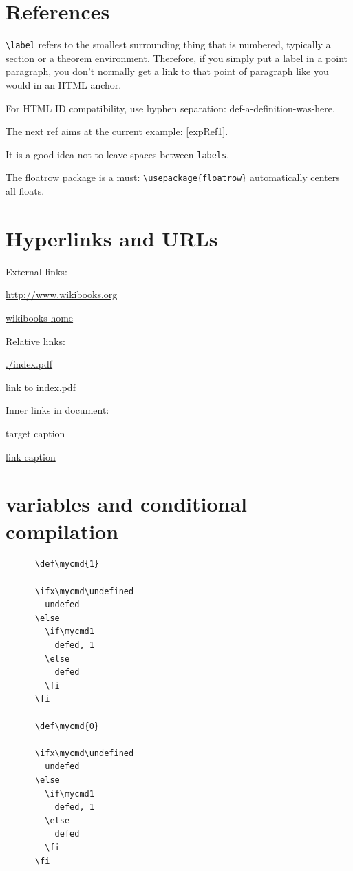 \documentclass[12pt]{article}
\begin{document}
\section{References}\label{references}

  \lstinline|\label| refers to the smallest surrounding thing that is numbered,
  typically a section or a theorem environment.
  Therefore, if you simply put a label in a point paragraph,
  you don't normally get a link to that point of paragraph like you would in an HTML anchor.

  For HTML ID compatibility, use hyphen separation: def-a-definition-was-here.

  \begin{example} \label{expRef1}
    The next ref aims at the current example: \ref{expRef1}.
  \end{example}

  It is a good idea not to leave spaces between \lstinline|labels|.

  The floatrow package is a must: \lstinline|\usepackage{floatrow}| automatically centers all floats.

\section{Hyperlinks and URLs}\label{hyperlinks-urls}

  External links:

  \url{http://www.wikibooks.org}

  \href{http://www.wikibooks.org}{wikibooks home}

  Relative links:

  \url{./index.pdf}

  \href{./index.pdf}{link to index.pdf}

  Inner links in document:

  \hypertarget{label}{target caption}

  \hyperlink{label}{link caption}

  \section{variables and conditional compilation}

    \begin{lstlisting}
      \def\mycmd{1}

      \ifx\mycmd\undefined
        undefed
      \else
        \if\mycmd1
          defed, 1
        \else
          defed
        \fi
      \fi

      \def\mycmd{0}

      \ifx\mycmd\undefined
        undefed
      \else
        \if\mycmd1
          defed, 1
        \else
          defed
        \fi
      \fi
    \end{lstlisting}
\end{document}
